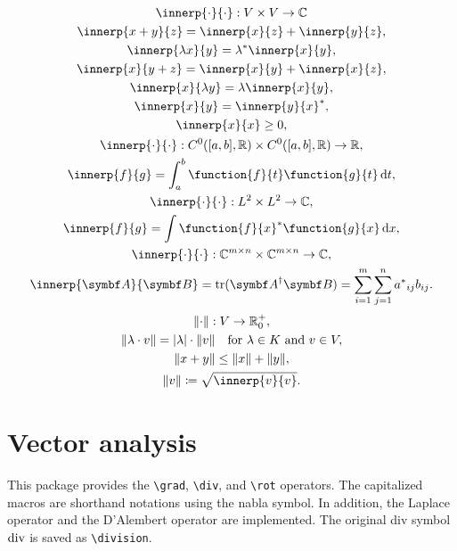 \documentclass[DIV=13]{scrartcl}
\begin{document}
\begin{gather}
  \innerp{\cdot}{\cdot}: V \times V \to \Cnums \\
  \innerp{x+y}{z} = \innerp{x}{z} + \innerp{y}{z}, \\
  \innerp{\lambda x}{y} = \cc{\lambda}\innerp{x}{y}, \\
  \innerp{x}{y+z} = \innerp{x}{y} + \innerp{x}{z}, \\
  \innerp{x}{\lambda y} = \lambda\innerp{x}{y}, \\
  \innerp{x}{y} = \cc{\innerp{y}{x}}, \\
  \innerp{x}{x} \geq 0, \\
  \innerp{\cdot}{\cdot}: C^0(\cinterval{a,b},\Rnums)
  \times C^0(\cinterval{a,b},\Rnums) \to \Rnums, \\
  \innerp{f}{g} = \int_a^b \function{f}{t}\function{g}{t}\diff t, \\
  \innerp{\cdot}{\cdot}: L^2 \times L^2 \to \Cnums, \\
  \innerp{f}{g} = \int \cc{\function{f}{x}}\function{g}{x}\diff x, \\
  \innerp{\cdot}{\cdot}: \Cnums^{m\times n} \times \Cnums^{m\times n}
  \to \Cnums, \\
  \innerp{\mat{A}}{\mat{B}} = \trace(\mat{A}^\adjoint\mat{B}) =
  \sum_{i=1}^m\sum_{j=1}^n \cc{a}_{ij} b_{ij}.
\end{gather}
\begin{gather}
  \norm{\cdot} : V\to \Rnums_0^+, \\
  \norm{\lambda\cdot v} = \abs{\lambda}\cdot\norm{v}\quad\text{for }
  \lambda\in K \text{ and } v\in V, \\
  \norm{x+y} \leq \norm{x} + \norm{y}, \\
  \norm{v}\coloneq\sqrt{\innerp{v}{v}}.
\end{gather}


\section{Vector analysis}
This package provides the \verb|\grad|, \verb|\div|, and \verb|\rot|
operators. The capitalized macros are shorthand notations using the nabla
symbol. In addition, the Laplace operator and the D'Alembert operator are
implemented. The original div symbol $\operatorname{div}$ is saved as \verb|\division|.
\end{document}
